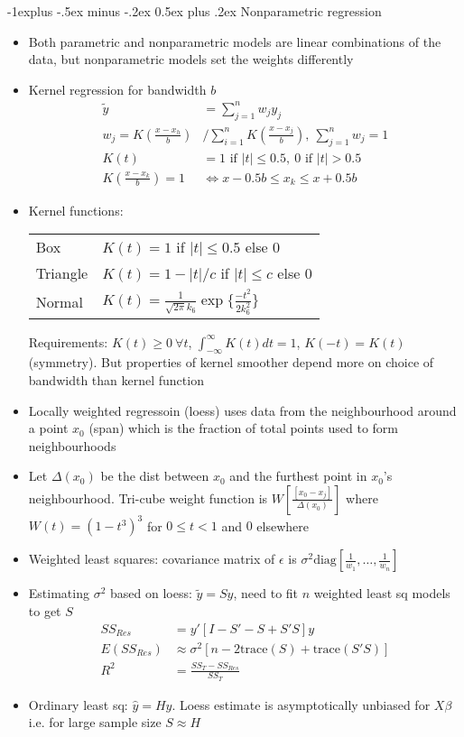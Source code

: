 \documentclass[frenchspacing,9pt,landscape,a4paper]{article}
\makeatletter
\renewcommand{\subsection}{\@startsection{subsection}{2}{0mm}%
                                {-1explus -.5ex minus -.2ex}%
                                {0.5ex plus .2ex}%
                                {\normalfont\normalsize\bfseries}}
\newcommand{\abs}[1]{\left\lvert #1 \right\rvert}
\makeatother
\begin{document}
\begin{multicols}{3}
\subsection{Nonparametric regression}
\begin{itemize}
	\item Both parametric and nonparametric models are linear combinations of the data, but nonparametric models set the weights differently
	\item Kernel regression for bandwidth $b$
		\begin{align*}
			\tilde{y}&=\sum_{j=1}^nw_jy_j\\
			w_j=K\left(\frac{x-x_h}{b}\right) &/\sum_{i=1}^n K\left(\frac{x-x_j}{b}\right),\ \sum_{j=1}^nw_j=1\\
			K(t)&=1\text{ if }\abs{t}\leq 0.5,\ 0 \text{ if }\abs{t}>0.5\\
			K\left(\frac{x-x_k}{b}\right)=1&\iff x-0.5b\leq x_k\leq x+0.5b
		\end{align*}
	\item Kernel functions:
		\begin{tabular}{l l}
			Box & $K(t)=1$ if  $\abs{t}\leq 0.5$ else  $0$\\ 
			Triangle &  $K(t)=1-\abs{t}/c$ if  $\abs{t}\leq c$ else  $0$\\
			Normal & $K(t)=\frac{1}{\sqrt{2\pi}k_6}\exp\{\frac{-t^2}{2k_6^2}\}$
		\end{tabular} Requirements: $K(t)\geq 0\ \forall t$, $\int_{-\infty}^\infty K(t)dt=1$, $K(-t)=K(t)$ (symmetry). But properties of kernel smoother depend more on choice of bandwidth than kernel function
	\item Locally weighted regressoin (loess) uses data from the neighbourhood around a point $x_0$ (span) which is the fraction of total points used to form neighbourhoods
	\item Let $\Delta(x_0)$ be the dist between $x_0$ and the furthest point in $x_0$'s neighbourhood. Tri-cube weight function is $W\left[\frac{[x_0-x_j]}{\Delta(x_0)}\right]$ where $W(t)=(1-t^3)^3$ for  $0\leq t<1$ and  $0$ elsewhere
	\item Weighted least squares: covariance matrix of  $\epsilon$ is  $\sigma^2\text{diag}[\frac{1}{w_1},\dots,\frac{1}{w_n}]$
	\item Estimating $\sigma^2$ based on loess:  $\tilde{y}=Sy$, need to fit $n$ weighted least sq models to get $S$
		\begin{align*}
			SS_{Res}&=y'[I-S'-S+S'S]y\\
			E(SS_{Res})&\approx\sigma^2[n-2\text{trace}(S)+\text{trace}(S'S)]\\
			R^2&=\frac{SS_T-SS_{Res}}{SS_T}
		\end{align*}
	\item Ordinary least sq: $\hat{y}=Hy$. Loess estimate is asymptotically unbiased for $X\beta$ i.e. for large sample size $S\approx H$
\end{itemize}

\end{multicols}
\end{document}
